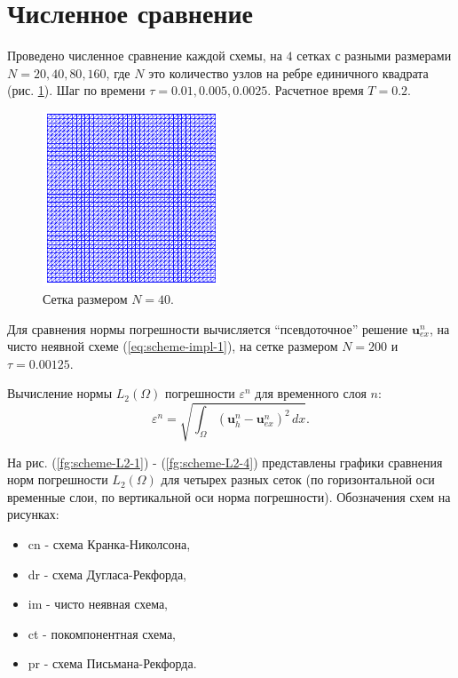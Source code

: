 \documentclass[12pt]{article}
\begin{document}
\section{Численное сравнение}
Проведено численное сравнение каждой схемы, на $4$ сетках  с разными размерами $N = 20, 40, 80, 160$, где $N$ это количество узлов на ребре единичного квадрата (рис. \ref{fg:scheme-mesh}). Шаг по времени $\tau = 0.01, 0.005, 0.0025$. Расчетное время $T=0.2$.

\begin{figure}
	\begin{center}
		\includegraphics[width=200px]{pics/mesh}
		\caption{Сетка размером $N=40$.}
		\label{fg:scheme-mesh}
	\end{center}
\end{figure}


Для сравнения нормы погрешности вычисляется ``псевдоточное'' решение ${\bm u}_{ex}^n$, на чисто неявной схеме (\ref{eq:scheme-impl-1}), на сетке размером $N=200$ и $\tau=0.00125$.


Вычисление нормы $L_2(\Omega)$ погрешности $\varepsilon^n$ для временного слоя $n$:
$$
\varepsilon^n = \sqrt{\int_{\Omega} ({\bm u}_h^n - {\bm u}_{ex}^n )^2 \, dx}.
$$

На рис. (\ref{fg:scheme-L2-1}) - (\ref{fg:scheme-L2-4}) представлены графики сравнения норм погрешности $L_2(\Omega)$  для четырех разных сеток (по горизонтальной оси временные слои, по вертикальной оси норма погрешности). Обозначения схем на рисунках:
\begin{itemize}
\item cn - схема Кранка-Николсона,
\item dr - схема Дугласа-Рекфорда,
\item im - чисто неявная схема,
\item ct - покомпонентная схема,
\item pr - схема Письмана-Рекфорда.
\end{itemize}
\end{document}

